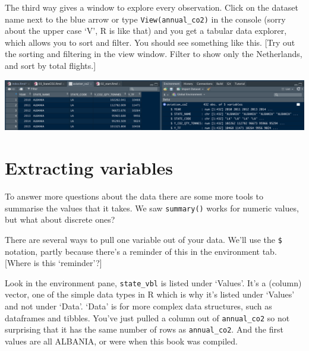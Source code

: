 \documentclass[
]{book}
\newenvironment{Shaded}{\begin{snugshade}}{\end{snugshade}}
\newcommand{\CommentTok}[1]{\textcolor[rgb]{0.56,0.35,0.01}{\textit{#1}}}
\newcommand{\FunctionTok}[1]{\textcolor[rgb]{0.00,0.00,0.00}{#1}}
\newcommand{\NormalTok}[1]{#1}
\newcommand{\OtherTok}[1]{\textcolor[rgb]{0.56,0.35,0.01}{#1}}
\newcommand{\SpecialCharTok}[1]{\textcolor[rgb]{0.00,0.00,0.00}{#1}}
\begin{document}
The third way gives a window to explore every observation. Click on the dataset name next to the blue arrow or type \texttt{View(annual\_co2)} in the console (sorry about the upper case `V', R is like that) and you get a tabular data explorer, which allows you to sort and filter. You should see something like this. {[}Try out the sorting and filtering in the view window. Filter to show only the Netherlands, and sort by total flights.{]}

\includegraphics{images/CO2inViewAndEnvironment.png}

\hypertarget{extractfield}{%
\section{Extracting variables}\label{extractfield}}

To answer more questions about the data there are some more tools to summarise the values that it takes. We saw \texttt{summary()} works for numeric values, but what about discrete ones?

There are several ways to pull one variable out of your data. We'll use the \texttt{\$} notation, partly because there's a reminder of this in the environment tab. {[}Where is this `reminder'?{]}

\begin{Shaded}
\end{Shaded}

Look in the environment pane, \texttt{state\_vbl} is listed under `Values'. It's a (column) vector, one of the simple data types in R which is why it's listed under `Values' and not under `Data'. `Data' is for more complex data structures, such as dataframes and tibbles. You've just pulled a column out of \texttt{annual\_co2} so not surprising that it has the same number of rows as \texttt{annual\_co2}. And the first values are all ALBANIA, or were when this book was compiled.
\end{document}
